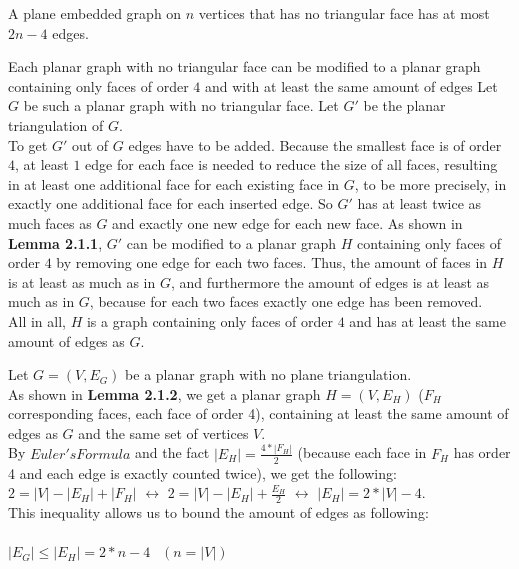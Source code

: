 \documentclass[a4paper]{article}
\begin{document}
\begin{solution}{19}
\begin{theorem} {A plane embedded graph on $n$ vertices that has no triangular face has at most $2n-4$ edges.}
			\begin{lemma} {Each planar graph with no triangular face can be modified to a planar graph containing only faces of order $4$  and with at least the same amount of edges}
				Let $G$ be such a planar graph with no triangular face. Let $G'$ be the planar triangulation of $G$.\\
				To get $G'$ out of $G$ edges have to be added. Because the smallest face is of order $4$, at least $1$ edge for each face is needed to reduce the size of all faces, resulting in at least one additional face for each existing face in $G$, to be more precisely, in exactly one additional face for each inserted edge. So $G'$ has at least twice as much faces as $G$ and exactly one new edge for each new face. As shown in \textbf{Lemma 2.1.1}, $G'$ can be modified to a planar graph $H$ containing only faces of order $4$ by removing one edge for each two faces. Thus, the amount of faces in $H$ is at least as much as in $G$, and furthermore the amount of edges is at least as much as in $G$, because for each two faces exactly one edge has been removed.\\
				All in all, $H$ is a graph containing only faces of order $4$ and has at least the same amount of edges as $G$.
			\end{lemma}		
			
	
			Let $G=(V,E_G)$ be a planar graph with no plane triangulation.\\
			As shown in \textbf{Lemma 2.1.2}, we get a planar graph $H=(V,E_H)$ ($F_H$ corresponding faces, each face of order 4), containing at least the same amount of edges as $G$ and the same set of vertices $V$.\\
			
			By $Euler's Formula$ and the fact $|E_H|= \frac{4 * |F_H|}{2}$ (because each face in $F_H$ has order 4 and each edge is exactly counted twice), we get the following:\\
			$2 = |V| - |E_H| +|F_H|$ $\leftrightarrow$ $2 = |V| - |E_H| + \frac{E_H}{2}$ $\leftrightarrow$ $|E_H| = 2 * |V| - 4$.\\
			This inequality allows us to bound the amount of edges as following:\\\\
			$|E_G| \leq |E_H| = 2 * n - 4$   $~~(n=|V|)$
			
		\end{theorem}
	\end{solution}
	\newpage
\end{document}
